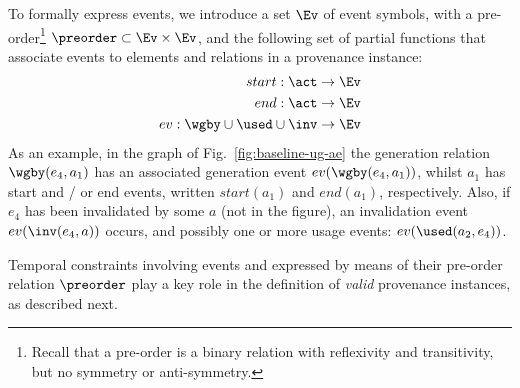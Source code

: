 To formally express events, we introduce a set $\Ev$ of event symbols, with a pre-order\footnote{Recall that a pre-order is a binary relation with reflexivity and transitivity, but no symmetry or anti-symmetry.} $\preorder \subset \Ev \times \Ev$, and the following set of partial functions that associate events to elements and relations in a provenance instance:
\begin{align*}
start: \act \rightarrow \Ev \\
end: \act \rightarrow \Ev \\
ev: \wgby \cup \used \cup \inv \rightarrow \Ev
\end{align*}	
As an example, in the graph of Fig.~\ref{fig:baseline-ug-ae} the generation relation $\wgby(e_4, a_1)$ has an associated generation event $ev(\wgby(e_4, a_1))$, whilst $a_1$ has start and / or end events, written $start(a_1)$ and $end(a_1)$, respectively. Also, if $e_4$ has been invalidated by some $a$ (not in the figure), an invalidation event $ev(\inv(e_4,a))$ occurs, and possibly one or more usage events: $ev(\used(a_2, e_4))$. 

Temporal constraints involving events and expressed by means of their pre-order relation $\preorder$ play a key role in the definition of \textit{valid} provenance instances, as described next.
